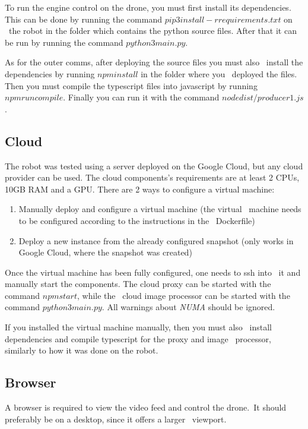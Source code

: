 To run the engine control on the drone, you must first install its dependencies.
This can be done by running the command $pip3 install -r requirements.txt$ on \
the robot in the folder which contains the python source files.
After that it can be run by running the command $python3 main.py$.

As for the outer comms, after deploying the source files you must also \
install the dependencies by running $npm install$ in the folder where you \
deployed the files.
Then you must compile the typescript files into javascript by running \
$npm run compile$.
Finally you can run it with the command $node dist/producer1.js$.


\subsection{Cloud}
\label{subsec:user-manual-cloud}
The robot was tested using a server deployed on the Google Cloud,
but any cloud provider can be used.
The cloud components's requirements are at least 2 CPUs, 10GB RAM and
a GPU.
There are 2 ways to configure a virtual machine:
\begin{enumerate}
    \item Manually deploy and configure a virtual machine (the virtual \
        machine needs to be configured according to the instructions in the \
        Dockerfile)
    \item Deploy a new instance from the already configured snapshot
        (only works in Google Cloud, where the snapshot was created)
\end{enumerate}
Once the virtual machine has been fully configured, one needs to ssh into \
it and manually start the components.
The cloud proxy can be started with the command $npm start$, while the \
cloud image processor can be started with the command $python3 main.py$.
All warnings about \textit{NUMA} should be ignored.

If you installed the virtual machine manually, then you must also \
install dependencies and compile typescript for the proxy and image \
processor, similarly to how it was done on the robot.

\subsection{Browser}
\label{subsec:user-manual-browser}
A browser is required to view the video feed and control the drone.\
It should preferably be on a desktop, since it offers a larger \
viewport.

